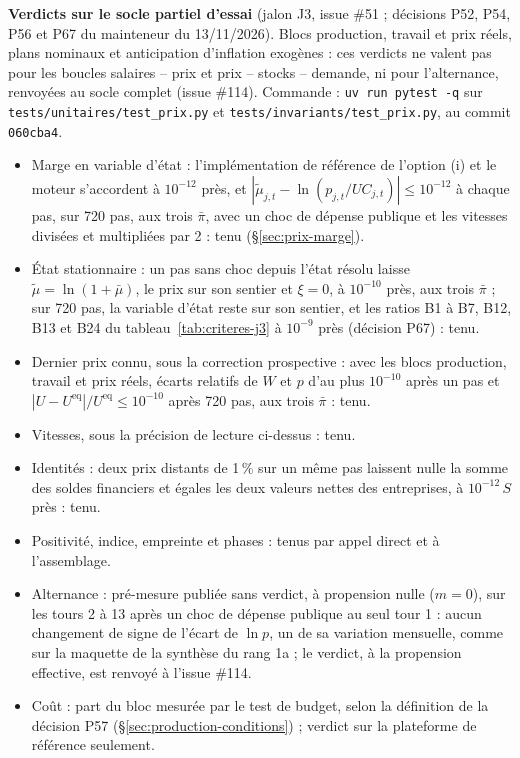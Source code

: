 \documentclass[11pt,a4paper]{article}
\begin{document}
{\setlength{\emergencystretch}{3em}\textbf{Verdicts sur le socle partiel d'essai} (jalon J3, issue \#51 ; décisions P52, P54, P56 et P67 du mainteneur du 13/11/2026). Blocs production, travail et prix réels, plans nominaux et anticipation d'inflation exogènes : ces verdicts ne valent pas pour les boucles salaires -- prix et prix -- stocks -- demande, ni pour l'alternance, renvoyées au socle complet (issue \#114). Commande : \texttt{uv run pytest -q} sur \nolinkurl{tests/unitaires/test_prix.py} et \nolinkurl{tests/invariants/test_prix.py}, au commit \texttt{060cba4}.\par}
\begin{itemize}
\item Marge en variable d'état : l'implémentation de référence de l'option (i) et le moteur s'accordent à $10^{-12}$ près, et $|\tilde\mu_{j,t} - \ln(p_{j,t}/\mathit{UC}_{j,t})| \le 10^{-12}$ à chaque pas, sur 720 pas, aux trois $\bar\pi$, avec un choc de dépense publique et les vitesses divisées et multipliées par 2 : tenu (\S\ref{sec:prix-marge}).
\item État stationnaire : un pas sans choc depuis l'état résolu laisse $\tilde\mu = \ln(1 + \bar\mu)$, le prix sur son sentier et $\xi = 0$, à $10^{-10}$ près, aux trois $\bar\pi$ ; sur 720 pas, la variable d'état reste sur son sentier, et les ratios B1 à B7, B12, B13 et B24 du tableau~\ref{tab:criteres-j3} à $10^{-9}$ près (décision P67) : tenu.
\item Dernier prix connu, sous la correction prospective : avec les blocs production, travail et prix réels, écarts relatifs de $W$ et $p$ d'au plus $10^{-10}$ après un pas et $|U - U^{\mathrm{eq}}|/U^{\mathrm{eq}} \le 10^{-10}$ après 720 pas, aux trois $\bar\pi$ : tenu.
\item Vitesses, sous la précision de lecture ci-dessus : tenu.
\item Identités : deux prix distants de 1\,\% sur un même pas laissent nulle la somme des soldes financiers et égales les deux valeurs nettes des entreprises, à $10^{-12}\,S$ près : tenu.
\item Positivité, indice, empreinte et phases : tenus par appel direct et à l'assemblage.
\item Alternance : pré-mesure publiée sans verdict, à propension nulle ($m = 0$), sur les tours 2 à 13 après un choc de dépense publique au seul tour 1 : aucun changement de signe de l'écart de $\ln p$, un de sa variation mensuelle, comme sur la maquette de la synthèse du rang 1a ; le verdict, à la propension effective, est renvoyé à l'issue \#114.
\item Coût : part du bloc mesurée par le test de budget, selon la définition de la décision P57 (\S\ref{sec:production-conditions}) ; verdict sur la plateforme de référence seulement.
\end{itemize}
\end{document}
